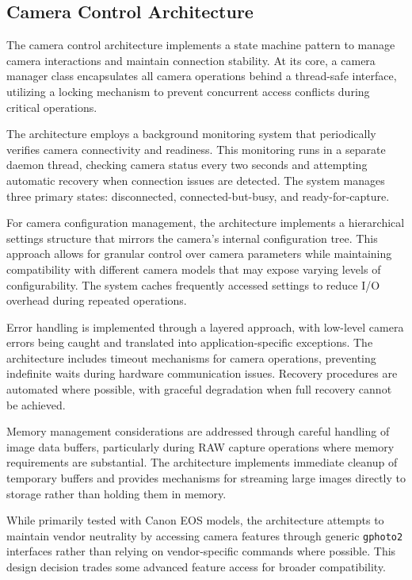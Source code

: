 \subsection{Camera Control Architecture}
The camera control architecture implements a state machine pattern to manage camera interactions and maintain connection stability. At its core, a camera manager class encapsulates all camera operations behind a thread-safe interface, utilizing a locking mechanism to prevent concurrent access conflicts during critical operations.

The architecture employs a background monitoring system that periodically verifies camera connectivity and readiness. This monitoring runs in a separate daemon thread, checking camera status every two seconds and attempting automatic recovery when connection issues are detected. The system manages three primary states: disconnected, connected-but-busy, and ready-for-capture.

For camera configuration management, the architecture implements a hierarchical settings structure that mirrors the camera's internal configuration tree. This approach allows for granular control over camera parameters while maintaining compatibility with different camera models that may expose varying levels of configurability. The system caches frequently accessed settings to reduce I/O overhead during repeated operations.

Error handling is implemented through a layered approach, with low-level camera errors being caught and translated into application-specific exceptions. The architecture includes timeout mechanisms for camera operations, preventing indefinite waits during hardware communication issues. Recovery procedures are automated where possible, with graceful degradation when full recovery cannot be achieved.

Memory management considerations are addressed through careful handling of image data buffers, particularly during RAW capture operations where memory requirements are substantial. The architecture implements immediate cleanup of temporary buffers and provides mechanisms for streaming large images directly to storage rather than holding them in memory.

While primarily tested with Canon EOS models, the architecture attempts to maintain vendor neutrality by accessing camera features through generic \texttt{gphoto2} interfaces rather than relying on vendor-specific commands where possible. This design decision trades some advanced feature access for broader compatibility.

